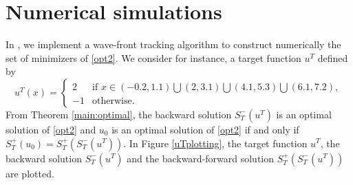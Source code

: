 \documentclass{article}
\begin{document}
\section{Numerical simulations} %


In \cite[Section 3]{LZ19}, we  implement a wave-front tracking algorithm to construct numerically the set of  minimizers of \eqref{opt2}.  We consider for instance, a target function $u^T$  defined by 
\begin{equation} \label{uT} u^T(x)=\left\{\begin{array}{ll}
2 &\text{if} \, \,x\in (-0.2,1.1)\bigcup(2,3.1)\bigcup (4.1,5.3)\bigcup (6.1,7.2), \\
-1 & \text{otherwise}.
\end{array}\right.
\end{equation}
From Theorem \ref{main:optimal},  the backward solution $S_T^-(u^T)$ is an  optimal solution of \eqref{opt2} and  $u_0$ is an optimal solution of \eqref{opt2} if and only if  $S_T^+(u_0)=S_T^+ (S_T^-(u^T))$. In Figure \ref{uTplotting}, the target function $u^T$, the backward solution $S_T^-(u^T)$ and  the backward-forward solution $S_T^+ (S_T^-(u^T))$ are plotted.  \ \\
\end{document}
